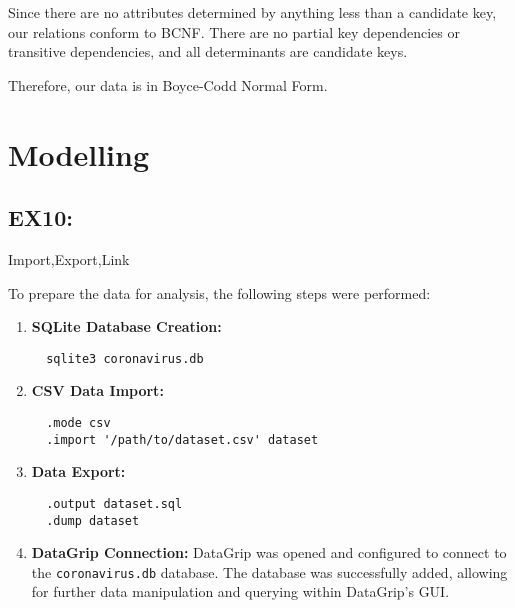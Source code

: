 \documentclass{article}
\begin{document}
\vspace{5mm}

Since there are no attributes determined by anything less than a candidate key, our relations conform to BCNF. There are no partial key dependencies or transitive dependencies, and all determinants are candidate keys.

\vspace{5mm}

Therefore, our data is in Boyce-Codd Normal Form.


\maketitle
\section{Modelling}

\vspace{1mm}


\subsection{EX10:} Import,Export,Link

\vspace{2 mm}

To prepare the data for analysis, the following steps were performed:

\begin{enumerate}
  \item \textbf{SQLite Database Creation:}
  \begin{lstlisting}
  sqlite3 coronavirus.db
  \end{lstlisting}
  \item \textbf{CSV Data Import:}
  \begin{lstlisting}
  .mode csv
  .import '/path/to/dataset.csv' dataset
  \end{lstlisting}
  
  \item \textbf{Data Export:}

  \begin{lstlisting}
  .output dataset.sql
  .dump dataset
  \end{lstlisting}

  \item \textbf{DataGrip Connection:}
  DataGrip was opened and configured to connect to the \texttt{coronavirus.db} database. The database was successfully added, allowing for further data manipulation and querying within DataGrip's GUI.
\end{enumerate}
\end{document}
